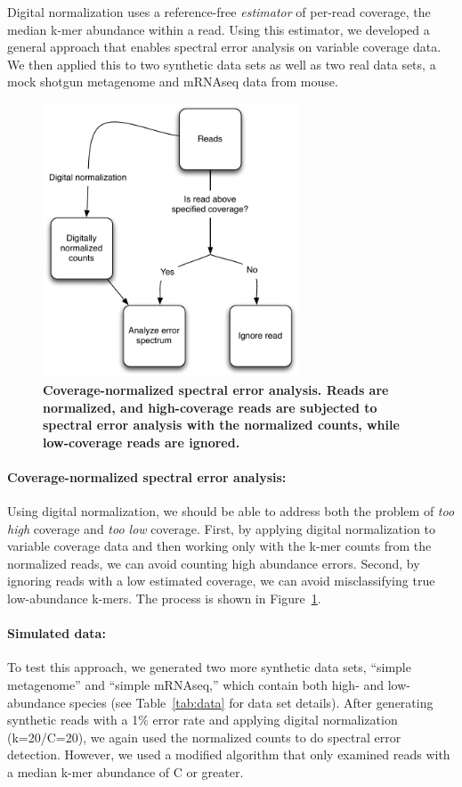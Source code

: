 \documentclass{article}
\begin{document}
Digital normalization uses a reference-free {\em estimator} of
per-read coverage, the median k-mer abundance within a read.  Using
this estimator, we developed a general approach that enables spectral
error analysis on variable coverage data.  We then applied this to two
synthetic data sets as well as two real data sets, a mock shotgun
metagenome and mRNAseq data from mouse.

\begin{figure}[!ht]
 \centerline{\includegraphics[width=3in]{./figures/coverage-aware-spectrum}}
\caption{{\bf Coverage-normalized spectral error analysis.  Reads are
    normalized, and high-coverage reads are subjected to spectral
    error analysis with the normalized counts, while low-coverage
    reads are ignored.}}
\label{fig:covaware}
\end{figure}

\paragraph{Coverage-normalized spectral error analysis:}

Using digital normalization, we should be able to address both the
problem of {\em too high} coverage and {\em too low} coverage.
First, by applying digital normalization to variable
coverage data and then working only with the k-mer counts from the
normalized reads, we can avoid counting high abundance errors.
Second, by ignoring reads with a low estimated coverage, we can
avoid misclassifying true low-abundance k-mers.  The process
is shown in  Figure~\ref{fig:covaware}.


\paragraph{Simulated data:}
To test this approach, we generated two more synthetic data sets,
``simple metagenome'' and ``simple mRNAseq,'' which contain both high-
and low-abundance species (see Table~\ref{tab:data} for data set
details).  After generating synthetic reads with a 1\% error rate and
applying digital normalization (k=20/C=20), we again used the normalized
counts to do spectral error detection.  However, we used a modified
algorithm that only examined reads with a median k-mer abundance of C
or greater.
\end{document}
